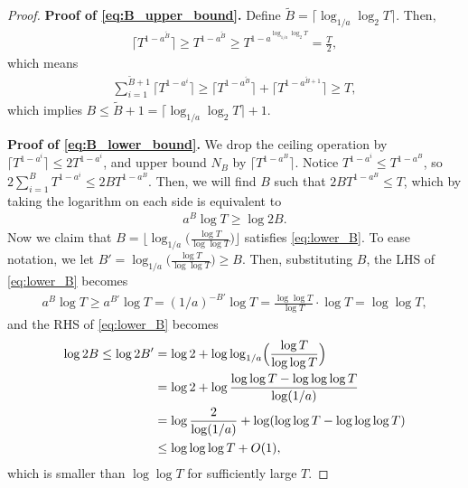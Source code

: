\documentclass[10pt,a4paper]{amsart}
\begin{document}
\begin{proof}
    \textbf{Proof of \eqref{eq:B_upper_bound}.} 
    Define 
    $\tilde{B} = \lceil \log_{1/a}\log_2 T \rceil$. Then,
    \begin{align}
        \lceil T^{1-a^{\tilde{B}}} \rceil
        \geq T^{1-a^{\tilde{B}}}
        \geq T^{1-a^{\log_{1/a}\log_2 T}}
        = \frac{T}{2},
    \end{align}
    which means
    \begin{align}
        \sum_{i=1}^{\tilde{B}+1} \lceil T^{1-a^{i}} \rceil 
        \geq \lceil T^{1-a^{\tilde{B}}} \rceil + \lceil T^{1-a^{\tilde{B}+1}} \rceil 
        \geq T,
    \end{align}
    which implies $B\leq \tilde{B}+1 = \lceil \log_{1/a}\log_2 T \rceil + 1 $.
    
    \textbf{Proof of \eqref{eq:B_lower_bound}.} We drop the ceiling operation by $\lceil T^{1-a^i} \rceil \leq 2 T^{1-a^i}$, and upper bound $N_{B} $ by $\lceil T^{1-a^{B}} \rceil$.
    Notice $T^{1-a^i} \leq T^{1-a^{B}} $, so $2 \sum_{i=1}^{B} T^{1-a^i} \leq 2 B T^{1-a^{B}}  $. 
    Then, we will find $B$ such that $2 B T^{1-a^{B}} \leq T$, which by taking the logarithm on each side is equivalent to
    \begin{align}
        a^{B}\log T\geq \log 2B. \label{eq:lower_B}
    \end{align}
    Now we claim that $B = \bigl\lfloor \log_{1/a}\bigl(\frac{\log T}{\log\log T}\bigr) \bigr\rfloor$ satisfies \eqref{eq:lower_B}. To ease notation, we let $B' = \log_{1/a}\bigl(\frac{\log T}{\log\log T}\bigr) \geq B$. Then, substituting $B$, the LHS of \eqref{eq:lower_B} becomes
    \begin{align}
        a^{B}\log T
        \geq a^{B'}\log T
        = (1/a)^{-B'}\log T
        = \frac{\log \log T}{\log T}\cdot \log T
        = \log\log T,
    \end{align}
    and the RHS of \eqref{eq:lower_B} becomes
    \begin{align}
        \log 2B
        \leq \log 2B'
        & = \log 2 + \log\log_{1/a}\Bigl(\frac{\log T}{\log\log T}\Bigr) \\
        & = \log 2 + \log \frac{\log\log T - \log\log\log T}{\log (1/a)} \\
        & = \log \frac{2}{\log(1/a)} + \log (\log\log T - \log\log\log T) \\
        & \leq \log\log\log T + O(1),
    \end{align}
    which is smaller than $\log\log T$ for sufficiently large $T$. 
\end{proof}
\end{document}
